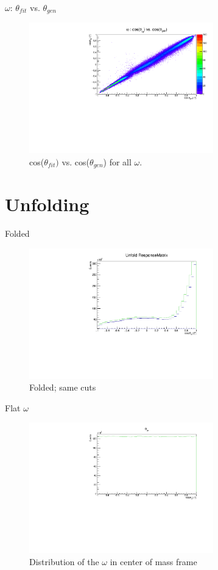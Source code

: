 \documentclass[
		10pt
		]{beamer}
\begin{document}
\begin{frame} {$\omega$: $\theta_{fit}$ vs. $\theta_{gen}$}

\begin{figure}
	
	\includegraphics[width=8cm]{Plots/MC/1/ThetaTheta1Omega.pdf}
	\caption{cos($\theta_{fit})$ vs. cos($\theta_{gen}$) for all $\omega$.}
	
\end{figure}

\end{frame}


\section{Unfolding}

\begin{frame}{Folded}
	\begin{figure}
		\includegraphics[width=8cm]{Plots/WholeUnfold35.pdf}
		\caption{Folded; same cuts}
	\end{figure}
\end{frame}

\begin{frame}{Flat $\omega$}
	\begin{figure}
		\includegraphics[width=8cm]{Plots/OmegaFlat.pdf}
		\caption{Distribution of the $\omega$ in center of mass frame}
	\end{figure}
\end{frame}
\end{document}
